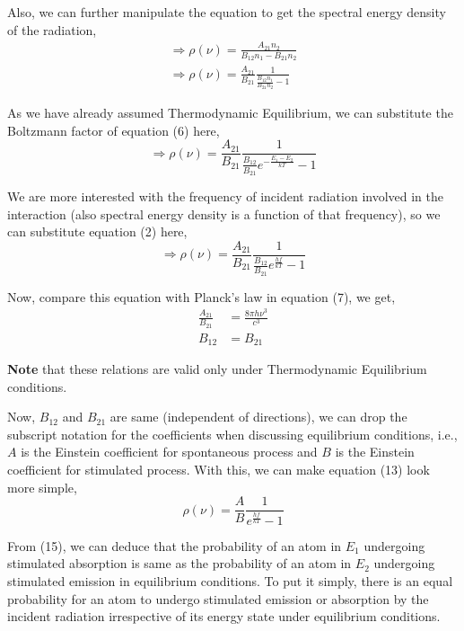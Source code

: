 \documentclass[12pt]{article}
\begin{document}
Also, we can further manipulate the equation to get the spectral energy density of the radiation,
\begin{align*}
    \Rightarrow \rho(\nu) = \frac{A_{21}n_{2}}{B_{12}n_{1} - B_{21}n_{2}} \\
    \Rightarrow \rho(\nu) = \frac{A_{21}}{B_{21}} \frac{1}{\frac{B_{12}n_{1}}{B_{21}n_{2}} - 1}
\end{align*}

As we have already assumed Thermodynamic Equilibrium, we can substitute the Boltzmann factor of equation (6) here,
\begin{equation*}
    \Rightarrow \rho(\nu) = \frac{A_{21}}{B_{21}} \frac{1}{\frac{B_{12}}{B_{21}} e^{-\frac{E_{1} - E_{2}}{kT}} - 1}
\end{equation*} \vspace{.2cm}

We are more interested with the frequency of incident radiation involved in the interaction (also spectral energy density is a function of that frequency), so we can substitute equation (2) here,
\begin{equation}
    \Rightarrow \rho(\nu) = \frac{A_{21}}{B_{21}} \frac{1}{\frac{B_{12}}{B_{21}} e^{\frac{hf}{kT}} - 1}
\end{equation}

Now, compare this equation with Planck's law in equation (7), we get,
\begin{align}
    \frac{A_{21}}{B_{21}} & = \frac{8\pi h \nu^3}{c^3} \\
    B_{12} & = B_{21}
\end{align}

\textbf{Note} that these relations are valid only under Thermodynamic Equilibrium conditions. \vspace{.2cm}

Now, $B_{12}$ and $B_{21}$ are same (independent of directions), we can drop the subscript notation for the coefficients when discussing equilibrium conditions, i.e., $A$ is the Einstein coefficient for spontaneous process and $B$ is the Einstein coefficient for stimulated process. With this, we can make equation (13) look more simple,
\begin{equation*}
    \rho(\nu) = \frac{A}{B} \frac{1}{e^{\frac{hf}{kT}} - 1}
\end{equation*} 

From (15), we can deduce that the probability of an atom in $E_{1}$ undergoing stimulated absorption is same as the probability of an atom in $E_{2}$ undergoing stimulated emission in equilibrium conditions. To put it simply, there is an equal probability for an atom to undergo stimulated emission or absorption by the incident radiation irrespective of its energy state under equilibrium conditions. \vspace{.2cm} 
\end{document}
